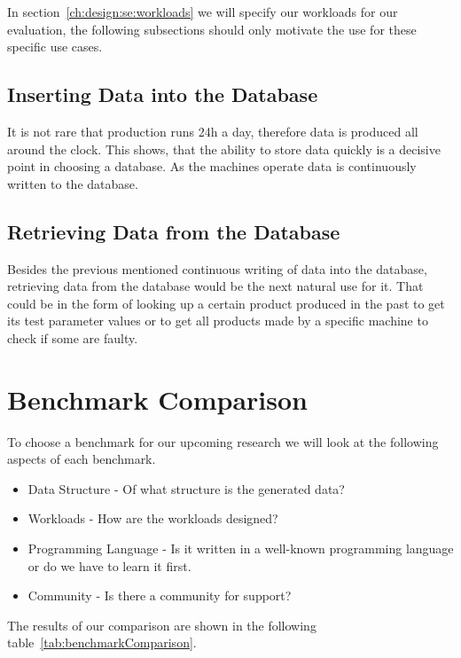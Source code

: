 In section~\ref{ch:design:se:workloads} we will specify our workloads for our evaluation,
the following subsections should only motivate the use for these specific use cases.

\subsection{Inserting Data into the Database}
\label{ch:analysis:se:insertingData}
It is not rare that production runs 24h a day,
therefore data is produced all around the clock.
This shows,
that the ability to store data quickly is a decisive point in choosing a database.
As the machines operate data is continuously written to the database.

\subsection{Retrieving Data from the Database}
\label{ch:analysis:se:retrievingData}
Besides the previous mentioned continuous writing of data into the database,
retrieving data from the database would be the next natural use for it.
That could be in the form of looking up a certain product produced in the past to get its test parameter values or to get all products made by a specific machine to check if some are faulty.

\section{Benchmark Comparison}
\label{ch:analysis:se:benchmark}
To choose a benchmark for our upcoming research we will look at the following aspects of each benchmark.

\begin{itemize}
  \item Data Structure - Of what structure is the generated data?
  \item Workloads - How are the workloads designed?
  \item Programming Language - Is it written in a well-known programming language or do we have to learn it first.
  \item Community - Is there a community for support?
\end{itemize}

The results of our comparison are shown in the following table~\ref{tab:benchmarkComparison}.

